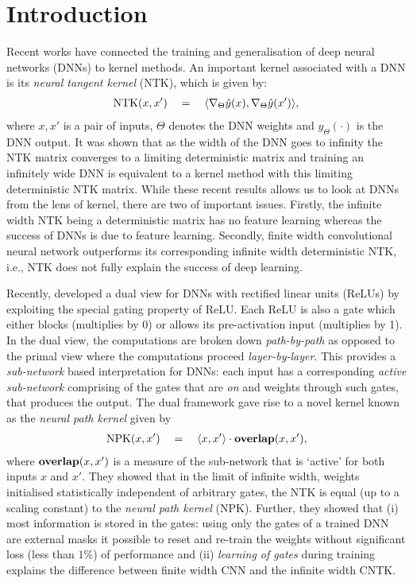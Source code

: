 \documentclass{article}
\begin{document}
\section{Introduction}
Recent works have connected the training  and generalisation of deep neural networks (DNNs) to kernel methods. An important kernel associated with a DNN is its \emph{neural tangent kernel} (NTK), which is given by:
\begin{align*}
 \text{NTK}(x,x')\quad = \quad \langle \nabla_{\Theta}\hat{y}(x), \nabla_{\Theta}\hat{y}(x')\rangle,
\end{align*}
where $x,x'$ is a pair of inputs, $\Theta$ denotes the DNN weights and $\hat{y}_\Theta(\cdot)$ is the DNN output. It was shown that as the width of the DNN goes to infinity the NTK matrix converges to a limiting deterministic matrix and training an infinitely wide DNN is equivalent to a kernel method with this limiting deterministic NTK matrix. While these recent results allows us to look at DNNs from the lens of kernel, there are two of important issues. Firstly, the infinite width NTK being a deterministic matrix has no feature learning whereas the success of DNNs is due to feature learning. Secondly, finite width convolutional neural network outperforms its corresponding infinite width deterministic NTK, i.e., NTK does not fully explain the success of deep learning.

Recently, \citet{npk} developed a dual view for DNNs with rectified linear units (ReLUs) by exploiting the special gating property of ReLU. Each ReLU is also a gate which either blocks (multiplies by 0) or allows its pre-activation input (multiplies by 1). In the dual view, the computations are broken down \emph{path-by-path} as opposed to the primal view where the computations proceed \emph{layer-by-layer}. This provides a \emph{sub-network} based interpretation for DNNs: each input has a corresponding \emph{active sub-network} comprising of the gates that are \emph{on} and weights through such gates, that produces the output. The dual framework gave rise to a novel kernel known as the \emph{neural path kernel} given by 
\begin{align*}
 \text{NPK}(x,x')\quad =\quad \langle x,x'\rangle\cdot {\bf{overlap}}(x,x'),
\end{align*}
where ${\bf{overlap}}(x,x')$ is a measure of the sub-network that is `active' for both inputs $x$ and $x'$. They showed that in the limit of infinite width, weights initialised statistically independent of arbitrary gates, the NTK is equal (up to a scaling constant) to the \emph{neural path kernel} (NPK). Further, they showed that (i) most information is stored in the gates: using only the gates of a trained DNN are external masks it possible to reset and re-train the weights without significant loss (less than $1\%$) of performance and (ii) \emph{learning of gates} during training explains the difference between finite width CNN and the infinite width CNTK. 
\end{document}
